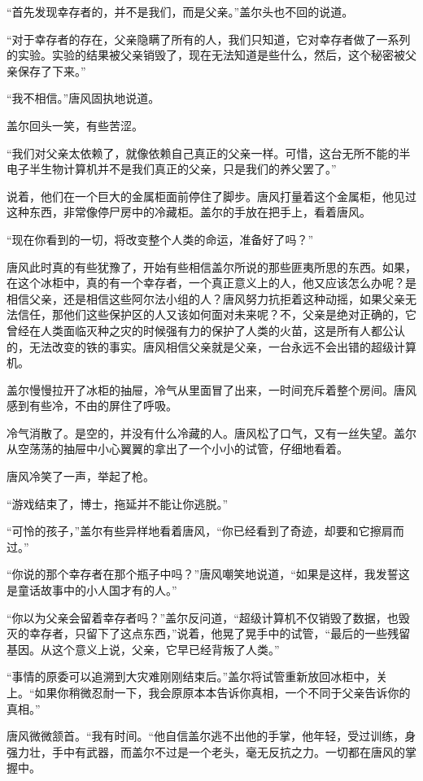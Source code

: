 “首先发现幸存者的，并不是我们，而是父亲。”盖尔头也不回的说道。

“对于幸存者的存在，父亲隐瞒了所有的人，我们只知道，它对幸存者做了一系列的实验。实验的结果被父亲销毁了，现在无法知道是些什么，然后，这个秘密被父亲保存了下来。”

“我不相信。”唐风固执地说道。

盖尔回头一笑，有些苦涩。

“我们对父亲太依赖了，就像依赖自己真正的父亲一样。可惜，这台无所不能的半电子半生物计算机并不是我们真正的父亲，只是我们的养父罢了。”

说着，他们在一个巨大的金属柜面前停住了脚步。唐风打量着这个金属柜，他见过这种东西，非常像停尸房中的冷藏柜。盖尔的手放在把手上，看着唐风。

“现在你看到的一切，将改变整个人类的命运，准备好了吗？”

唐风此时真的有些犹豫了，开始有些相信盖尔所说的那些匪夷所思的东西。如果，在这个冰柜中，真的有一个幸存者，一个真正意义上的人，他又应该怎么办呢？是相信父亲，还是相信这些阿尔法小组的人？唐风努力抗拒着这种动摇，如果父亲无法信任，那他们这些保护区的人又该如何面对未来呢？不，父亲是绝对正确的，它曾经在人类面临灭种之灾的时候强有力的保护了人类的火苗，这是所有人都公认的，无法改变的铁的事实。唐风相信父亲就是父亲，一台永远不会出错的超级计算机。

盖尔慢慢拉开了冰柜的抽屉，冷气从里面冒了出来，一时间充斥着整个房间。唐风感到有些冷，不由的屏住了呼吸。

冷气消散了。是空的，并没有什么冷藏的人。唐风松了口气，又有一丝失望。盖尔从空荡荡的抽屉中小心翼翼的拿出了一个小小的试管，仔细地看着。

唐风冷笑了一声，举起了枪。

“游戏结束了，博士，拖延并不能让你逃脱。”

“可怜的孩子，”盖尔有些异样地看着唐风，“你已经看到了奇迹，却要和它擦肩而过。”

“你说的那个幸存者在那个瓶子中吗？”唐风嘲笑地说道，“如果是这样，我发誓这是童话故事中的小人国才有的人。”

“你以为父亲会留着幸存者吗？”盖尔反问道，“超级计算机不仅销毁了数据，也毁灭的幸存者，只留下了这点东西，”说着，他晃了晃手中的试管，“最后的一些残留基因。从这个意义上说，父亲，它早已经背叛了人类。”

“事情的原委可以追溯到大灾难刚刚结束后。”盖尔将试管重新放回冰柜中，关上。“如果你稍微忍耐一下，我会原原本本告诉你真相，一个不同于父亲告诉你的真相。”

唐风微微颔首。“我有时间。“他自信盖尔逃不出他的手掌，他年轻，受过训练，身强力壮，手中有武器，而盖尔不过是一个老头，毫无反抗之力。一切都在唐风的掌握中。


